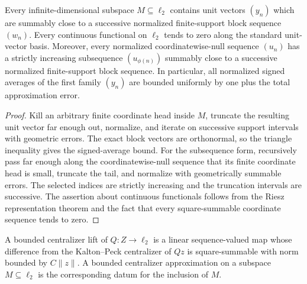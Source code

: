 \begin{lemma}\label{lem:hilbert-gliding-hump}
Every infinite-dimensional subspace $M\subseteq\ell_2$ contains unit vectors $(y_n)$ which are
summably close to a successive normalized finite-support block sequence $(w_n)$.  Every continuous
functional on $\ell_2$ tends to zero along the standard unit-vector basis.  Moreover, every
normalized coordinatewise-null sequence $(u_n)$ has a strictly increasing subsequence
$(u_{\phi(n)})$ summably close to a successive normalized finite-support block sequence.
In particular, all normalized signed averages of the first family $(y_n)$ are bounded uniformly by
one plus the total approximation error.
\leanok
\end{lemma}

\begin{proof}
Kill an arbitrary finite coordinate head inside $M$, truncate the resulting unit vector far
enough out, normalize, and iterate on successive support intervals with geometric errors.  The
exact block vectors are orthonormal, so the triangle inequality gives the signed-average bound.
For the subsequence form, recursively pass far enough along the coordinatewise-null sequence that
its finite coordinate head is small, truncate the tail, and normalize with geometrically summable
errors.  The selected indices are strictly increasing and the truncation intervals are successive.
The assertion about continuous functionals follows from the Riesz representation theorem and the
fact that every square-summable coordinate sequence tends to zero.
\end{proof}

\begin{definition}\label{def:bounded-centralizer-data}
A bounded centralizer lift of $Q:Z\to\ell_2$ is a linear sequence-valued map whose difference
from the Kalton--Peck centralizer of $Qz$ is square-summable with norm bounded by
$C\lVert z\rVert$.  A bounded centralizer approximation on a subspace
$M\subseteq\ell_2$ is the corresponding datum for the inclusion of $M$.
\leanok
\end{definition}

